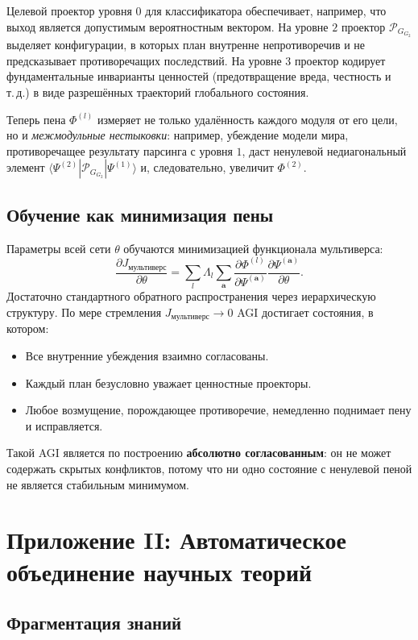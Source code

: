 \documentclass[11pt,a4paper]{article}
\theoremstyle{definition}
\newcommand{\pG}{\mathcal{P}_{\!G}}
\newcommand{\Foam}{\Phi}
\newcommand{\Jfunc}{J_{\text{мультиверс}}}
\begin{document}
Целевой проектор уровня $0$ для классификатора обеспечивает, например, что выход является допустимым вероятностным вектором. На уровне $2$ проектор $\pG_{G_2}$ выделяет конфигурации, в которых план внутренне непротиворечив и не предсказывает противоречащих последствий. На уровне $3$ проектор кодирует фундаментальные инварианты ценностей (предотвращение вреда, честность и т. д.) в виде разрешённых траекторий глобального состояния.

Теперь пена $\Foam^{(l)}$ измеряет не только удалённость каждого модуля от его цели, но и \emph{межмодульные нестыковки}: например, убеждение модели мира, противоречащее результату парсинга с уровня $1$, даст ненулевой недиагональный элемент $\langle \Psi^{(2)}|\pG_{G_2}|\Psi^{(1)}\rangle$ и, следовательно, увеличит $\Foam^{(2)}$.

\subsection{Обучение как минимизация пены}

Параметры всей сети $\theta$ обучаются минимизацией функционала мультиверса:
\[
\frac{\partial \Jfunc}{\partial \theta} = \sum_{l} \Lambda_l \sum_{\mathbf{a}} \frac{\partial \Foam^{(l)}}{\partial \Psi^{(\mathbf{a})}} \frac{\partial \Psi^{(\mathbf{a})}}{\partial \theta}.
\]
Достаточно стандартного обратного распространения через иерархическую структуру. По мере стремления $\Jfunc \to 0$ AGI достигает состояния, в котором:
\begin{itemize}
    \item Все внутренние убеждения взаимно согласованы.
    \item Каждый план безусловно уважает ценностные проекторы.
    \item Любое возмущение, порождающее противоречие, немедленно поднимает пену и исправляется.
\end{itemize}
Такой AGI является по построению \textbf{абсолютно согласованным}: он не может содержать скрытых конфликтов, потому что ни одно состояние с ненулевой пеной не является стабильным минимумом.

\section{Приложение II: Автоматическое объединение научных теорий}

\subsection{Фрагментация знаний}
\end{document}
